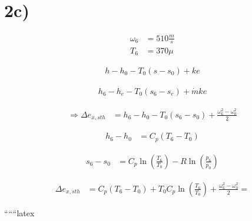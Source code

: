 

\section*{2c)}

\begin{align*}
    \omega_6 &= 510 \frac{m}{s} \\
    T_6 &= 370 \mu
\end{align*}

\begin{align*}
    h - h_0 - T_0 (s - s_0) + ke
\end{align*}

\begin{align*}
    h_6 - h_e - T_0 (s_6 - s_e) + \dot{m} ke
\end{align*}

\begin{align*}
    \Rightarrow \Delta e_{x,sth} &= h_6 - h_0 - T_0 (s_6 - s_0) + \frac{\omega_6^2 - \omega_0^2}{2}
\end{align*}

\begin{align*}
    h_6 - h_0 &= C_p (T_6 - T_0)
\end{align*}

\begin{align*}
    s_6 - s_0 &= C_p \ln \left( \frac{T_6}{T_0} \right) - R \ln \left( \frac{p_6}{p_0} \right)
\end{align*}

\begin{align*}
    \Delta e_{x,sth} &= C_p (T_6 - T_0) + T_0 C_p \ln \left( \frac{T_6}{T_0} \right) + \frac{\omega_6^2 - \omega_0^2}{2} = 
\end{align*}

``````latex
